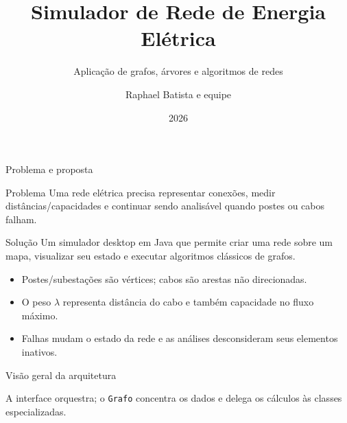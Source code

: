 \documentclass[aspectratio=169,10pt]{beamer}
\title{Simulador de Rede de Energia Elétrica}
\subtitle{Aplicação de grafos, árvores e algoritmos de redes}
\author{Raphael Batista e equipe}
\institute{Estrutura de Dados}
\date{2026}
\begin{document}
\begin{frame}
  \titlepage
\end{frame}

\begin{frame}{Problema e proposta}
  \begin{block}{Problema}
    Uma rede elétrica precisa representar conexões, medir distâncias/capacidades
    e continuar sendo analisável quando postes ou cabos falham.
  \end{block}
  \begin{block}{Solução}
    Um simulador desktop em Java que permite criar uma rede sobre um mapa,
    visualizar seu estado e executar algoritmos clássicos de grafos.
  \end{block}
  \vspace{0.3cm}
  \begin{itemize}
    \item Postes/subestações são vértices; cabos são arestas não direcionadas.
    \item O peso $\lambda$ representa distância do cabo e também capacidade no fluxo máximo.
    \item Falhas mudam o estado da rede e as análises desconsideram seus elementos inativos.
  \end{itemize}
\end{frame}

\begin{frame}{Visão geral da arquitetura}
\centering
{}

\vspace{0.35cm}
\small A interface orquestra; o \texttt{Grafo} concentra os dados e delega os cálculos às classes especializadas.
\end{frame}
\end{document}
